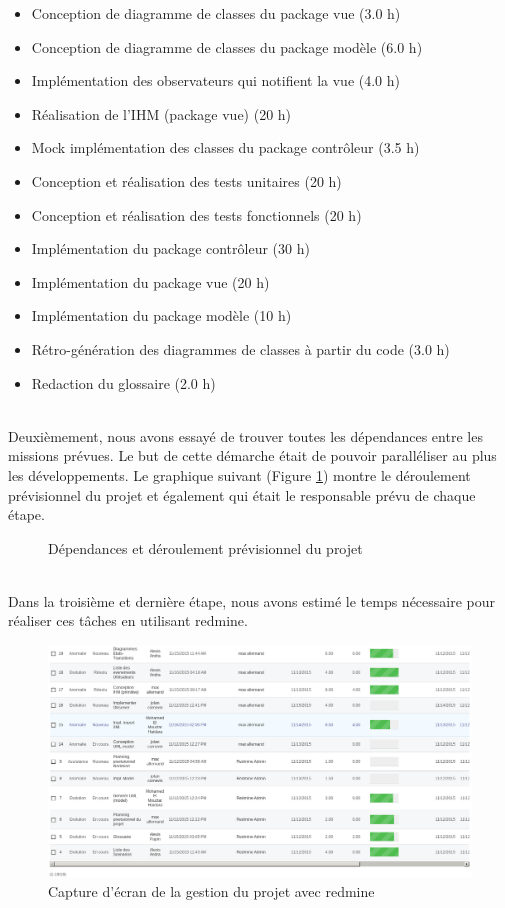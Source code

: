 \documentclass[10pt,a4paper]{book}
\begin{document}
\begin{itemize}
	\item{Conception de diagramme de classes du package vue (3.0 h)}
	\item{Conception de diagramme de classes du package modèle (6.0 h)}
	\item{Implémentation des observateurs qui notifient la vue (4.0 h)}
	\item{Réalisation de l'IHM (package vue) (20 h)}
	\item{Mock implémentation des classes du package contrôleur (3.5 h)}
	\item{Conception et réalisation des tests unitaires (20 h)}	
	\item{Conception et réalisation des tests fonctionnels (20 h)}
	\item{Implémentation du package contrôleur (30 h)}
	\item{Implémentation du package vue (20 h)}
	\item{Implémentation du package modèle (10 h)}
	\item{Rétro-génération des diagrammes de classes à partir du code (3.0 h)}
	\item{Redaction du glossaire (2.0 h)}
\end{itemize}
~\\Deuxièmement, nous avons essayé de trouver toutes les dépendances entre les missions prévues. Le but de cette démarche était de pouvoir paralléliser au plus les développements. Le graphique suivant (Figure \ref{Previsionnel}) montre le déroulement prévisionnel du projet et également qui était le responsable prévu de chaque étape.

\begin{figure}[H]
    \centering
    \scalebox{.65}{}
    \caption{\label{Previsionnel}Dépendances et déroulement prévisionnel du projet}
\end{figure}

~\\Dans la troisième et dernière étape, nous avons estimé le temps nécessaire pour réaliser ces tâches en utilisant redmine.
\begin{figure}[H]
    \centering
    \includegraphics[scale=0.38]{redmine.png}
    \caption{Capture d'écran de la gestion du projet avec redmine} 
\end{figure}
\end{document}
